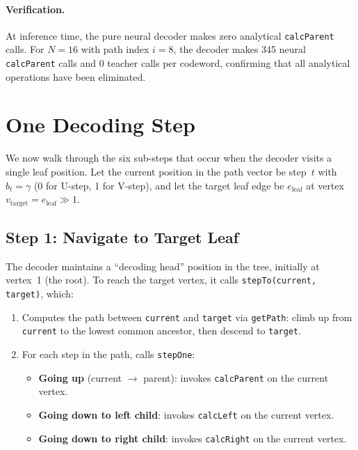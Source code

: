 \documentclass[11pt,a4paper]{article}
\begin{document}
\paragraph{Verification.} At inference time, the pure neural decoder makes zero analytical \texttt{calcParent} calls. For $N = 16$ with path index $i = 8$, the decoder makes 345 neural \texttt{calcParent} calls and 0 teacher calls per codeword, confirming that all analytical operations have been eliminated.

\section{One Decoding Step}
\label{sec:decoding_step}

We now walk through the six sub-steps that occur when the decoder visits a single leaf position. Let the current position in the path vector be step~$t$ with $b_t = \gamma$ (0 for U-step, 1 for V-step), and let the target leaf edge be $e_{\text{leaf}}$ at vertex $v_{\text{target}} = e_{\text{leaf}} \gg 1$.

\subsection{Step 1: Navigate to Target Leaf}

The decoder maintains a ``decoding head'' position in the tree, initially at vertex~1 (the root). To reach the target vertex, it calls \texttt{stepTo(current, target)}, which:
\begin{enumerate}[label=(\alph*)]
    \item Computes the path between \texttt{current} and \texttt{target} via \texttt{getPath}: climb up from \texttt{current} to the lowest common ancestor, then descend to \texttt{target}.
    \item For each step in the path, calls \texttt{stepOne}:
    \begin{itemize}
        \item \textbf{Going up} (current $\to$ parent): invokes \texttt{calcParent} on the current vertex.
        \item \textbf{Going down to left child}: invokes \texttt{calcLeft} on the current vertex.
        \item \textbf{Going down to right child}: invokes \texttt{calcRight} on the current vertex.
    \end{itemize}
\end{enumerate}
\end{document}
